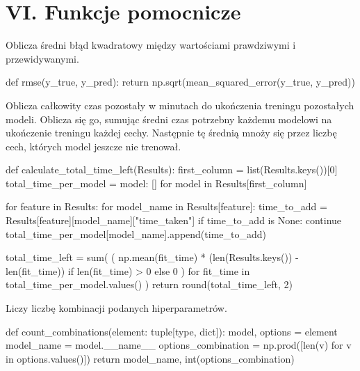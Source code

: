 {}
\justify
\fontsize{14}{16}\selectfont
\setlength{\parindent}{0pt}
\chapter*{VI. Funkcje pomocnicze} 
\fontsize{12}{14}\selectfont

\vspace{\baselineskip}
Oblicza średni błąd kwadratowy między wartościami prawdziwymi i przewidywanymi.
\begin{pythoncode}
def rmse(y_true, y_pred):
    return np.sqrt(mean_squared_error(y_true, y_pred))
\end{pythoncode}

\vspace{\baselineskip}
Oblicza całkowity czas pozostały w minutach do ukończenia treningu pozostałych modeli.
Oblicza się go, sumując średni czas potrzebny każdemu modelowi na ukończenie treningu każdej cechy.
Następnie tę średnią mnoży się przez liczbę cech, których model jeszcze nie trenował.
\begin{pythoncode}
def calculate_total_time_left(Results):
    first_column = list(Results.keys())[0]
    total_time_per_model = {model: [] for model in Results[first_column]}

    for feature in Results:
        for model_name in Results[feature]:
            time_to_add = Results[feature][model_name]["time_taken"]
            if time_to_add is None:
                continue
            total_time_per_model[model_name].append(time_to_add)

    total_time_left = sum(
        (
            np.mean(fit_time) * (len(Results.keys()) - len(fit_time))
            if len(fit_time) > 0
            else 0
        )
        for fit_time in total_time_per_model.values()
    )
    return round(total_time_left, 2)
\end{pythoncode}


\vspace{\baselineskip}
Liczy liczbę kombinacji podanych hiperparametrów.
\begin{pythoncode}
def count_combinations(element: tuple[type, dict]):
    model, options = element
    model_name = model.__name__
    options_combination = np.prod([len(v) for v in options.values()])
    return model_name, int(options_combination)
\end{pythoncode}

